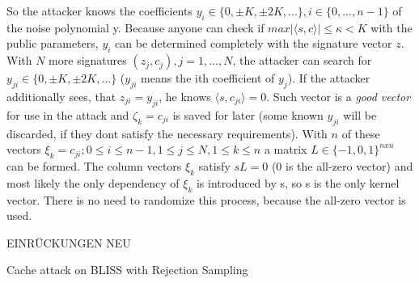 So the attacker knows the coefficients $y_i \in \{0, \pm K, \pm 2K,...\}, i \in \{0,...,n-1\}$ of the noise polynomial y. Because anyone can check if $max|\langle s,c \rangle |\le \kappa < K$ with the public parameters, $y_i$ can be determined completely with the signature vector $z$. With $N$ more signatures $(z_j, c_j), j =1,...,N$, the attacker can search for  $y_{ji} \in \{0, \pm K, \pm 2K,...\}$ ($y_{ji}$ means the ith coefficient of $y_j$). If the attacker additionally sees, that $z_{ji} = y_{ji}$, he knows $\langle s, c_{ji} \rangle = 0$. Such vector is a \textit{good vector} for use in the attack and $\zeta _k = c_{ji}$ is saved for later (some known $y_{ji}$ will be discarded, if they dont satisfy the necessary requirements). With $n$ of these vectors $\xi _k = c_{ji}; 0 \le i \le n-1, 1 \le j \le N, 1\le k \le n$ a matrix $L \in \{-1,0,1\}^{nxn}$ can be formed. The column vectors $\xi_k$ satisfy $sL = 0$ (0 is the all-zero vector) and most likely the only dependency of $\xi_k$ is introduced by s, so s is the only kernel vector. There is no need to randomize this process, because the all-zero vector is used.

EINRÜCKUNGEN NEU
\begin{algorithm}
	\caption{Cache attack on BLISS with Rejection Sampling}
	\label{algrctattack}
	\begin{algorithmic}[1]
				\EndIf
			\EndFor
		\EndWhile
			\State{}
		\EndFor
	\end{algorithmic}
\end{algorithm}   

